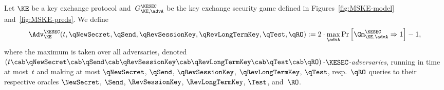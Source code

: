 \begin{definition}
	\label{def:MSKE-security}
	Let $\KE$ be a key exchange protocol and~$G^{\KESEC}_{\KE,\advA}$ be the key exchange security game defined in Figures~\ref{fig:MSKE-model} and~\ref{fig:MSKE-preds}.
	We define
	\[
		\Adv^{\KESEC}_{\KE}(t, \qNewSecret, \qSend, \qRevSessionKey, \qRevLongTermKey, \qTest, \qRO) := 2 \cdot \max_\advA \Pr \left[ \Gm^{\KESEC}_{\KE,\advA} \Rightarrow 1 \right] - 1,
	\]
	where the maximum is taken over all adversaries, denoted \emph{$(t\cab \qNewSecret\cab \qSend\cab \qRevSessionKey\cab \qRevLongTermKey\cab \qTest\cab \qRO)$-$\KESEC$-adversaries},
	running in time at most~$t$ and making at most $\qNewSecret$, $\qSend$, $\qRevSessionKey$, $\qRevLongTermKey$, $\qTest$, resp.\ $\qRO$ queries to their respective oracles $\NewSecret$, $\Send$, $\RevSessionKey$, $\RevLongTermKey$, $\Test$, and~$\RO$.
\end{definition}


